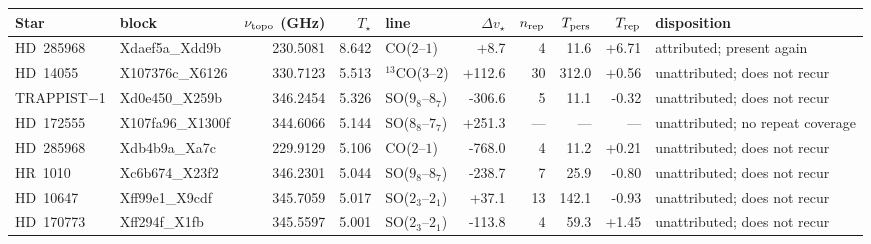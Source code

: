 \begin{tabular}{@{}l@{~}l@{~}r@{~}r@{~}l@{~}r@{~~}r@{~}r@{~}r@{~}l@{}}
\hline
Star & block & $\nu_{\rm topo}$ (GHz) & $T_\star$ & line & $\Delta v_\star$ & $n_{\rm rep}$ & $T_{\rm pers}$ & $T_{\rm rep}$ & disposition \\
\hline
HD~285968 & Xdaef5a\_Xdd9b & 230.5081 & 8.642 & CO($2$--$1$) & +8.7 & 4 & 11.6 & +6.71 & attributed; present again \\
HD~14055 & X107376c\_X6126 & 330.7123 & 5.513 & $^{13}$CO($3$--$2$) & +112.6 & 30 & 312.0 & +0.56 & unattributed; does not recur \\
TRAPPIST$-$1 & Xd0e450\_X259b & 346.2454 & 5.326 & SO($9_{8}$--$8_{7}$) & -306.6 & 5 & 11.1 & -0.32 & unattributed; does not recur \\
HD~172555 & X107fa96\_X1300f & 344.6066 & 5.144 & SO($8_{8}$--$7_{7}$) & +251.3 & --- & --- & --- & unattributed; no repeat coverage \\
HD~285968 & Xdb4b9a\_Xa7c & 229.9129 & 5.106 & CO($2$--$1$) & -768.0 & 4 & 11.2 & +0.21 & unattributed; does not recur \\
HR~1010 & Xc6b674\_X23f2 & 346.2301 & 5.044 & SO($9_{8}$--$8_{7}$) & -238.7 & 7 & 25.9 & -0.80 & unattributed; does not recur \\
HD~10647 & Xff99e1\_X9cdf & 345.7059 & 5.017 & SO($2_{3}$--$2_{1}$) & +37.1 & 13 & 142.1 & -0.93 & unattributed; does not recur \\
HD~170773 & Xff294f\_X1fb & 345.5597 & 5.001 & SO($2_{3}$--$2_{1}$) & -113.8 & 4 & 59.3 & +1.45 & unattributed; does not recur \\
\hline
\end{tabular}
